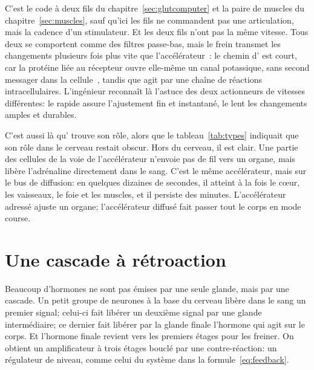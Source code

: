 C'est le code à deux fils du chapitre~\ref{sec:glutcomputer} et la paire de muscles du chapitre~\ref{sec:muscles}, sauf qu'ici les fils ne commandent pas une articulation, mais la cadence d'un stimulateur. Et les deux fils n'ont pas la même vitesse. Tous deux se comportent comme des filtres passe-bas, mais le frein transmet les changements plusieurs fois plus vite que l'accélérateur~\cite{Berger1989}: le chemin d' est court, car la protéine liée au récepteur ouvre elle-même un canal potassique, sans second messager dans la cellule~\cite{Logothetis1987gbg}, tandis que  agit par une chaîne de réactions intracellulaires. L'ingénieur reconnaît là l'astuce des deux actionneurs de vitesses différentes: le rapide assure l'ajustement fin et instantané, le lent les changements amples et durables.

C'est aussi là qu' trouve son rôle, alors que le tableau~\ref{tab:types} indiquait que son rôle dans le cerveau restait obscur. Hors du cerveau, il est clair. Une partie des cellules de la voie de l'accélérateur n'envoie pas de fil vers un organe, mais libère l'adrénaline directement dans le sang. C'est le même accélérateur, mais sur le bus de diffusion: en quelques dizaines de secondes, il atteint à la fois le cœur, les vaisseaux, le foie et les muscles, et il persiste des minutes. L'accélérateur adressé  ajuste un organe; l'accélérateur diffusé  fait passer tout le corps en mode course.

\section{Une cascade à rétroaction}

Beaucoup d'hormones ne sont pas émises par une seule glande, mais par une cascade. Un petit groupe de neurones à la base du cerveau libère dans le sang un premier signal; celui-ci fait libérer un deuxième signal par une glande intermédiaire; ce dernier fait libérer par la glande finale l'hormone qui agit sur le corps. Et l'hormone finale revient vers les premiers étages pour les freiner. On obtient un amplificateur à trois étages bouclé par une contre-réaction: un régulateur de niveau, comme celui du système  dans la formule~\eqref{eq:feedback}.

